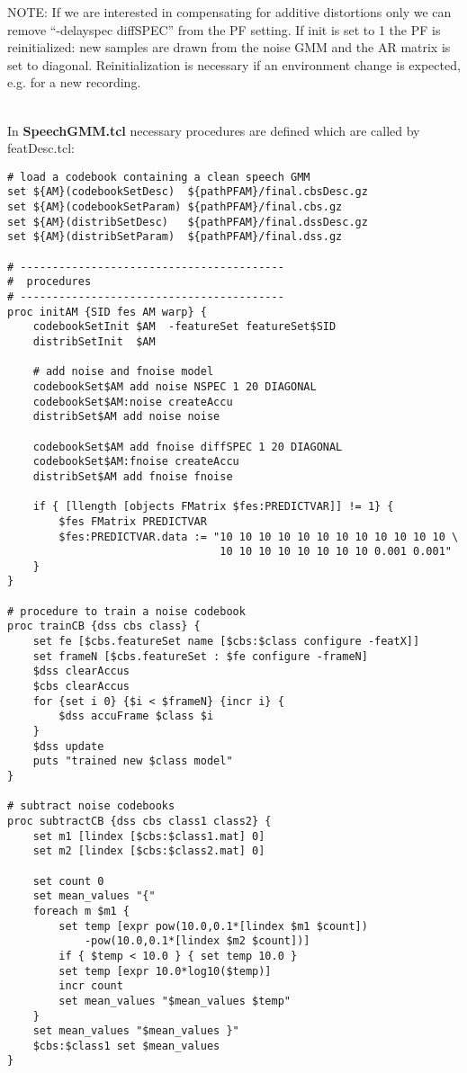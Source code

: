 \noindent
NOTE: If we are interested in compensating for additive distortions only we can remove ``-delayspec diffSPEC'' from the PF setting. If init is set to 1 the PF is reinitialized: new samples are drawn from the noise GMM and the AR matrix is set to diagonal. Reinitialization is necessary if an environment change is expected, e.g. for a new recording.

~ \\

\noindent
In \textbf{SpeechGMM.tcl} necessary procedures are defined which are called by featDesc.tcl:
\begin{verbatim}
# load a codebook containing a clean speech GMM
set ${AM}(codebookSetDesc)  ${pathPFAM}/final.cbsDesc.gz
set ${AM}(codebookSetParam) ${pathPFAM}/final.cbs.gz
set ${AM}(distribSetDesc)   ${pathPFAM}/final.dssDesc.gz
set ${AM}(distribSetParam)  ${pathPFAM}/final.dss.gz

# -----------------------------------------
#  procedures
# -----------------------------------------
proc initAM {SID fes AM warp} {
    codebookSetInit $AM  -featureSet featureSet$SID
    distribSetInit  $AM

    # add noise and fnoise model
    codebookSet$AM add noise NSPEC 1 20 DIAGONAL
    codebookSet$AM:noise createAccu
    distribSet$AM add noise noise  

    codebookSet$AM add fnoise diffSPEC 1 20 DIAGONAL
    codebookSet$AM:fnoise createAccu
    distribSet$AM add fnoise fnoise 

    if { [llength [objects FMatrix $fes:PREDICTVAR]] != 1} {
        $fes FMatrix PREDICTVAR
        $fes:PREDICTVAR.data := "10 10 10 10 10 10 10 10 10 10 10 10 \
                                 10 10 10 10 10 10 10 10 0.001 0.001"
    }    
}
  
# procedure to train a noise codebook
proc trainCB {dss cbs class} {
    set fe [$cbs.featureSet name [$cbs:$class configure -featX]]
    set frameN [$cbs.featureSet : $fe configure -frameN]
    $dss clearAccus
    $cbs clearAccus
    for {set i 0} {$i < $frameN} {incr i} {
        $dss accuFrame $class $i
    }
    $dss update
    puts "trained new $class model"
}

# subtract noise codebooks
proc subtractCB {dss cbs class1 class2} {
    set m1 [lindex [$cbs:$class1.mat] 0]
    set m2 [lindex [$cbs:$class2.mat] 0]
    
    set count 0
    set mean_values "{"
    foreach m $m1 {
        set temp [expr pow(10.0,0.1*[lindex $m1 $count])
            -pow(10.0,0.1*[lindex $m2 $count])]
        if { $temp < 10.0 } { set temp 10.0 }
        set temp [expr 10.0*log10($temp)]    
        incr count
        set mean_values "$mean_values $temp"
    }
    set mean_values "$mean_values }"
    $cbs:$class1 set $mean_values
}
\end{verbatim}
